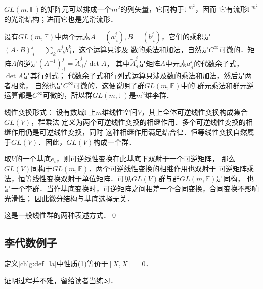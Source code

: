 $GL(m,\mathbb{F})$的矩阵元可以排成一个$m^2$的列矢量，它同构于$\mathbb{F}^{m^2}$，因而
它有流形$\mathbb{F}^{m^2}$的光滑结构；进而它也是光滑流形．

设有$GL(m,\mathbb{F})$中两个元素$A=(a^j_{\cdot i}), B=(b^j_{\cdot i})$，它们的乘积是
$(A\cdot B)^{j}_{\cdot i} = \sum_{k} a^j_{\cdot k} b^k_{\cdot i}$，这个运算只涉及
数的乘法和加法，自然是$C^\infty$可微的．矩阵$A$的逆是$(A^{-1})^{j}_{\cdot i}=\tilde{A}^{j}_{\cdot i}/{\det A}$，
其中$\tilde{A}^{j}_{\cdot i}$是矩阵$A$中元素$a^{j}_{\cdot i}$的代数余子式，$\det A$是其行列式；
代数余子式和行列式运算只涉及数的乘法和加法，然后是两者相除，
自然也是$C^\infty$可微的．这便说明了群$GL(m,\mathbb{F})$中的
群元乘法和群元逆运算都是$C^\infty$可微的，所以群$GL(m,\mathbb{F})$是$m^2$维{\kaishu 李群}．


{\heiti 线性变换形式}：
设有数域$\mathbb{F}$上$m$维线性空间$V$，其上全体可逆线性变换构成集合$GL(V)$，群乘法
定义为两个可逆线性变换的相继作用．多个可逆线性变换的相继作用仍是可逆线性变换，同时
这种相继作用满足结合律．恒等线性变换自然属于$GL(V)$．因此，$GL(V)$构成一个群．

取$V$的一个基底$e_i$，则可逆线性变换在此基底下双射于一个可逆矩阵，
那么$GL(V)$同构于$GL(m,\mathbb{F})$．两个可逆线性变换的相继作用也双射于
可逆矩阵乘法，恒等线性变换双射于单位矩阵．可见$GL(V)$群与群$GL(m,\mathbb{F})$是同构，
也是一个李群．当作基底变换时，可逆矩阵之间相差一个合同变换，合同变换不影响光滑性；
因此微分结构与基底选择无关．

这是一般线性群的两种表述方式．\qed



\subsection{李代数例子}

\begin{proposition}
    定义\ref{chlg:def_la}中性质(1)等价于$[X,X]=0$．
\end{proposition}
证明过程并不难，留给读者当练习．

